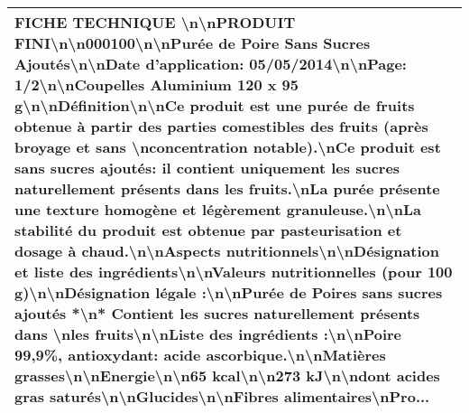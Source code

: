 \begin{tabular}{l}
 FICHE TECHNIQUE \textbackslash n\textbackslash nPRODUIT FINI\textbackslash n\textbackslash n000100\textbackslash n\textbackslash nPurée de Poire Sans Sucres Ajoutés\textbackslash n\textbackslash nDate d'application: 05/05/2014\textbackslash n\textbackslash nPage: 1/2\textbackslash n\textbackslash nCoupelles Aluminium 120 x 95 g\textbackslash n\textbackslash nDéfinition\textbackslash n\textbackslash nCe produit est une purée de fruits obtenue à partir des parties comestibles des fruits (après broyage et sans \textbackslash nconcentration notable).\textbackslash nCe produit est sans sucres ajoutés: il contient uniquement les sucres naturellement présents dans les fruits.\textbackslash nLa purée présente une texture homogène et légèrement granuleuse.\textbackslash n\textbackslash nLa stabilité du produit est obtenue par pasteurisation et dosage à chaud.\textbackslash n\textbackslash nAspects nutritionnels\textbackslash n\textbackslash nDésignation et liste des ingrédients\textbackslash n\textbackslash nValeurs nutritionnelles (pour 100 g)\textbackslash n\textbackslash nDésignation légale :\textbackslash n\textbackslash nPurée de Poires sans sucres ajoutés *\textbackslash n* Contient les sucres naturellement présents dans \textbackslash nles fruits\textbackslash n\textbackslash nListe des ingrédients :\textbackslash n\textbackslash nPoire 99,9\%, antioxydant: acide ascorbique.\textbackslash n\textbackslash nMatières grasses\textbackslash n\textbackslash nEnergie\textbackslash n\textbackslash n65 kcal\textbackslash n\textbackslash n273 kJ\textbackslash n\textbackslash ndont acides gras saturés\textbackslash n\textbackslash nGlucides\textbackslash n\textbackslash nFibres alimentaires\textbackslash nPro... \\
\bottomrule
\end{tabular}
